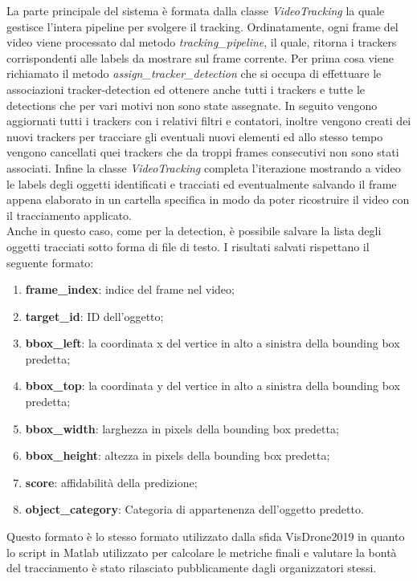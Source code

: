 La parte principale del sistema è formata dalla classe \textit{VideoTracking} la quale gestisce l'intera pipeline per svolgere il tracking. Ordinatamente, ogni frame del video viene processato dal metodo \textit{tracking\_pipeline}, il quale, ritorna i trackers corrispondenti alle labels da mostrare sul frame corrente. Per prima cosa viene richiamato il metodo \textit{assign\_tracker\_detection} che si occupa di effettuare le associazioni tracker-detection ed ottenere anche tutti i trackers e tutte le detections che per vari motivi non sono state assegnate. In seguito vengono aggiornati tutti i trackers con i relativi filtri e contatori, inoltre vengono creati dei nuovi trackers per tracciare gli eventuali nuovi elementi ed allo stesso tempo vengono cancellati quei trackers che da troppi frames consecutivi non sono stati associati. Infine la classe \textit{VideoTracking} completa l'iterazione mostrando a video le labels degli oggetti identificati e tracciati ed eventualmente salvando il frame appena elaborato in un cartella specifica in modo da poter ricostruire il video con il tracciamento applicato.\\
Anche in questo caso, come per la detection, è possibile salvare la lista degli oggetti tracciati sotto forma di file di testo. I risultati salvati rispettano il seguente formato:
\begin{enumerate}
\item \textbf{frame\_index}: indice del frame nel video;
\item \textbf{target\_id}: ID dell'oggetto;
\item \textbf{bbox\_left}: la coordinata x del vertice in alto a sinistra della bounding box predetta;
\item \textbf{bbox\_top}: la coordinata y del vertice in alto a sinistra della bounding box predetta;
\item \textbf{bbox\_width}: larghezza in pixels della bounding box predetta;
\item \textbf{bbox\_height}: altezza in pixels della bounding box predetta;
\item \textbf{score}: affidabilità della predizione;
\item \textbf{object\_category}: Categoria di appartenenza dell'oggetto predetto.
\end{enumerate}
Questo formato è lo stesso formato utilizzato dalla sfida VisDrone2019 in quanto lo script in Matlab utilizzato per calcolare le metriche finali e valutare la bontà del tracciamento è stato rilasciato pubblicamente dagli organizzatori stessi.

